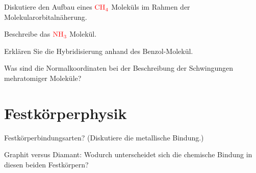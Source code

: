 \documentclass[a5paper,12pt,ngerman,print,grid=front]{kartei}
\let\oldce\ce
\renewcommand*{\ce}[1]{\begingroup\color{red}\oldce{#1}\endgroup}
\begin{document}
	\begin{karte}{
		Diskutiere den Aufbau eines $\ce{CH4}$ Moleküls im Rahmen der Molekularorbitalnäherung.
		}
		
		
		
	\end{karte}


	\begin{karte}{
		Beschreibe das $\ce{NH3}$ Molekül.
		}
		
		
		
	\end{karte}


	\begin{karte}{
		Erklären Sie die Hybridisierung anhand des Benzol-Molekül.
		}
		
		
		
	\end{karte}


	\begin{karte}{
		Was sind die Normalkoordinaten bei der Beschreibung der Schwingungen mehratomiger Moleküle?
		}
		
		
		
	\end{karte}




\section*{Festkörperphysik}



	\begin{karte}{
		Festkörperbindungsarten? (Diskutiere die metallische Bindung.)
		}
		
		
		
	\end{karte}


	\begin{karte}{
		Graphit versus Diamant: Wodurch unterscheidet sich die chemische Bindung in diesen
		beiden Festkörpern?
		}
		
		
		
	\end{karte}
\end{document}
